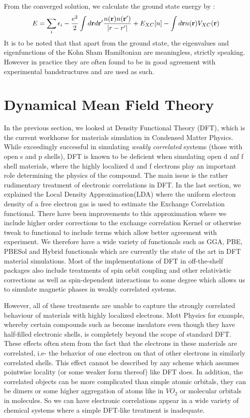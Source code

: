 \documentclass[10pt]{ruthesis}
\begin{document}
From the converged solution, we calculate the ground state energy by :
\begin{equation}
E=\sum_i \epsilon_i - \dfrac{e^2}{2}\int d\mathbf{r} d\mathbf{r}' \dfrac{n(\mathbf{r}) n(\mathbf{r}')}{|r-r'|} +E_{XC}[n] -\int d \mathbf{r} n(\mathbf{r}) V_{XC}(\mathbf{r})
\end{equation}
It is to be noted that that apart from the ground state, the eigenvalues and eigenfunctions of the Kohn Sham Hamiltonian are meaningless, strictly speaking. However in practice they are often found to be in good agreement with experimental bandstructures and are used as such.

\pagebreak
\chapter{Dynamical Mean Field Theory}





In the previous section, we looked at Density Functional Theory (DFT), which is the current workhorse for materials simulation in Condensed Matter Physics. While exceedingly successful in simulating \textit{weakly correlated} systems (those with open s and p shells), DFT is known to be deficient when simulating open d anf f shell materials, where the highly localized d and f electrons play an important role determining the physics of the compound. The main issue is the rather rudimentary treatment of electronic correlations in DFT. In the last section, we explained the Local Density Approximation(LDA) where the uniform electron density of a free electron gas is used to estimate the Exchange Correlation functional. There have been improvements to this approximation where we include higher order corrections to the exchange correlation Kernel or otherwise tweak to functional to include terms which allow better agreement with experiment. We therefore have a wide variety of functionals such as GGA, PBE, PBESol and Hybrid functionals which are currently the state of the art in DFT material simulations. Most of the implementations of DFT in off-the-shelf packages also include treatments of spin orbit coupling and other relativistic corrections as well as spin-dependent interactions to some degree which allows us to simulate magnetic phases in weakly correlated systems.

However, all of these treatments are unable to capture the strongly correlated behaviour of materials with highly localized electrons. Mott Physics for example, whereby certain compounds such as become insulators even though they have half-filled electronic shells, is completely beyond the scope of standard DFT. These effects often stem from the fact that the electrons in these materials are correlated, i.e- the behavior of one electron on that of other electrons in similarly correlated shells. This effect cannot be described by any scheme which assumes pointwise locality (or some weaker form thereof) like DFT does. In addition, the correlated objects can be more complicated than simple atomic orbitals, they can be dimers or some higher aggregation of atoms like in $VO_2$ or molecular orbitals in molecules. So we can have electronic correlations appear in a wide variety of chemical systems where a simple DFT-like treatment is inadequate.
\end{document}
